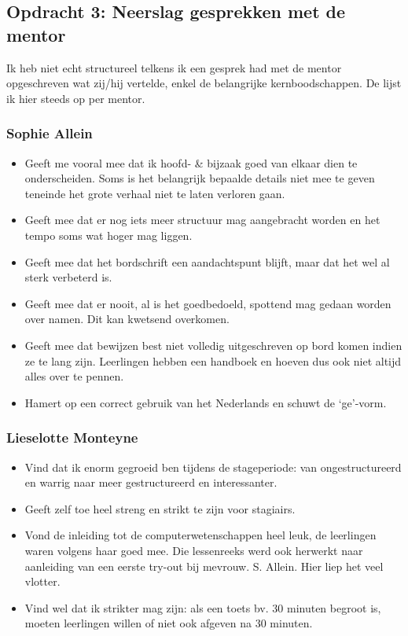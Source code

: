 \documentclass[a4paper,11pt]{article}
\theoremstyle{definition}
\begin{document}
\subsection{Opdracht 3: Neerslag gesprekken met de mentor}
Ik heb niet echt structureel telkens ik een gesprek had met de mentor 
opgeschreven wat zij/hij vertelde, enkel de belangrijke kernboodschappen. De 
lijst ik hier steeds op per mentor.
\subsubsection{Sophie Allein}
\begin{itemize}
  \item Geeft me vooral mee dat ik hoofd- \& bijzaak goed van elkaar dien te 
  onderscheiden. Soms is het belangrijk bepaalde details niet mee te geven 
  teneinde het grote verhaal niet te laten verloren gaan.
  \item Geeft mee dat er nog iets meer structuur mag aangebracht worden en het 
  tempo soms wat hoger mag liggen.
  \item Geeft mee dat het bordschrift een aandachtspunt blijft, maar dat het wel al sterk verbeterd is.
  \item Geeft mee dat er nooit, al is het goedbedoeld, spottend mag gedaan worden over namen. Dit kan kwetsend overkomen.
  \item Geeft mee dat bewijzen best niet volledig uitgeschreven op bord komen indien ze te lang zijn. Leerlingen hebben
  een handboek en hoeven dus ook niet altijd alles over te pennen. 
  \item Hamert op een correct gebruik van het Nederlands en schuwt de `ge'-vorm.
\end{itemize}
\subsubsection{Lieselotte Monteyne}
\begin{itemize}
  \item Vind dat ik enorm gegroeid ben tijdens de stageperiode: van 
  ongestructureerd en warrig naar meer gestructureerd en interessanter.
  \item Geeft zelf toe heel streng en strikt te zijn voor stagiairs.
  \item Vond de inleiding tot de computerwetenschappen heel leuk, de leerlingen waren volgens haar goed mee. Die 
  lessenreeks werd ook herwerkt naar aanleiding van een eerste try-out bij 
  mevrouw. S. Allein. Hier liep het veel vlotter.
  \item Vind wel dat ik strikter mag zijn: als een toets bv. 30 minuten begroot is, 
  moeten leerlingen willen of niet ook afgeven na 30 minuten. 
  
  \end{itemize}
\end{document}
